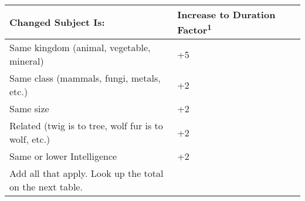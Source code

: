 \begin{longtable}{llll}
\hline
\multicolumn{1}{|p{2.870in}|}{\begin{minipage}[t]{2.870in}\raggedright
\textbf{Changed Subject Is:}\end{minipage}} & \multicolumn{1}{p{1.205in}|}{\begin{minipage}[t]{1.205in}\raggedleft
\textbf{Increase to Duration Factor}\textsuperscript{\textbf{1}}\end{minipage}}\\
\hline
\multicolumn{1}{p{0.069in}|}{\begin{minipage}[t]{0.069in}\raggedleft
Same kingdom (animal, vegetable, mineral)\end{minipage}} & \multicolumn{1}{p{0.069in}|}{\begin{minipage}[t]{0.069in}\raggedleft
+5\end{minipage}}\\
\hline
\multicolumn{1}{|p{2.870in}|}{\begin{minipage}[t]{2.870in}\raggedleft
Same class (mammals, fungi, metals, etc.)\end{minipage}} & \multicolumn{1}{p{1.205in}|}{\begin{minipage}[t]{1.205in}\raggedleft
+2\end{minipage}}\\
\hline
\multicolumn{1}{p{0.069in}|}{\begin{minipage}[t]{0.069in}\raggedleft
Same size\end{minipage}} & \multicolumn{1}{p{0.069in}|}{\begin{minipage}[t]{0.069in}\raggedleft
+2\end{minipage}}\\
\hline
\multicolumn{1}{|p{2.870in}|}{\begin{minipage}[t]{2.870in}\raggedleft
Related (twig is to tree, wolf fur is to wolf, etc.)\end{minipage}} & \multicolumn{3}{p{1.344in}|}{\begin{minipage}[t]{1.344in}\raggedleft
+2\end{minipage}}\\
\hline
\multicolumn{1}{p{0.069in}|}{\begin{minipage}[t]{0.069in}\raggedleft
Same or lower Intelligence\end{minipage}} & \multicolumn{1}{p{0.069in}|}{\begin{minipage}[t]{0.069in}\raggedleft
+2\end{minipage}}\\
\hline
\multicolumn{1}{|p{2.870in}|}{\begin{minipage}[t]{2.870in}\raggedleft
1 Add all that apply. Look up the total on the next table.\end{minipage}}\\
\hline
\end{longtable}

